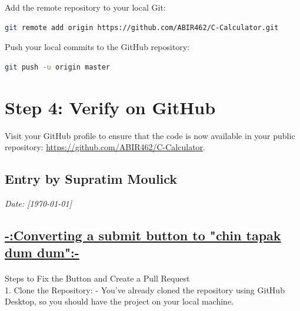 \documentclass[a4paper,12pt]{article}
\begin{document}
Add the remote repository to your local Git:
\begin{lstlisting}[language=bash, caption={Adding a remote repository}]
git remote add origin https://github.com/ABIR462/C-Calculator.git
\end{lstlisting}

Push your local commits to the GitHub repository:
\begin{lstlisting}[language=bash, caption={Pushing to GitHub}]
git push -u origin master
\end{lstlisting}

\section{Step 4: Verify on GitHub}

Visit your GitHub profile to ensure that the code is now available in your public repository: \href{https://github.com/ABIR462/C-Calculator}{https://github.com/ABIR462/C-Calculator}.



    
\newpage
{}
\vspace{-2cm}
\subsection*{Entry by Supratim Moulick}
\textit{Date: [\today]}\\
\date{\today}
\floatBarrier 
\begin{center}
\section*{\uline{-:Converting a submit button to "chin tapak dum dum":-}}
\end{center}
\paragraph{}
\vspace{0.5cm}
Steps to Fix the Button and Create a Pull Request\\

1. Clone the Repository:
   - You’ve already cloned the repository using GitHub Desktop, so you should have the project on your local machine.\\
\vspace{1cm}
\end{document}
